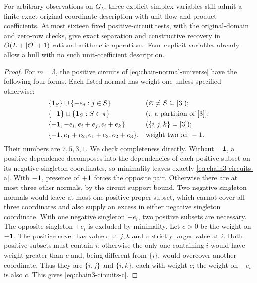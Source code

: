 \begin{theorem}\label{thm:three-state-chain}
For arbitrary observations on $G_L$, three explicit simplex variables
still admit a finite exact original-coordinate description with unit
flow and product coefficients. At most sixteen fixed positive-circuit tests,
with the original-domain and zero-row checks, give exact separation
and constructive recovery in $O(L+|\mathcal O|+1)$ rational arithmetic
operations. Four explicit variables already allow a hull with no
such unit-coefficient description.
\end{theorem}
\begin{proof}
For $m=3$, the positive circuits of \eqref{eq:chain-normal-universe}
have the following four forms. Each listed normal has weight one
unless specified otherwise:
\begin{align}
 &\{\mathbf 1_S\}\cup\{-e_j:j\in S\}
       &&(\varnothing\ne S\subseteq[3]);\label{eq:chain3-circuits-a}\\
 &\{-\mathbf 1\}\cup\{\mathbf 1_S:S\in\pi\}
       &&(\pi\text{ a partition of }[3]);\label{eq:chain3-circuits-b}\\
 &\{-\mathbf 1,-e_i,e_i+e_j,e_i+e_k\}
       &&(\{i,j,k\}=[3]);\label{eq:chain3-circuits-c}\\
 &\{-\mathbf 1,e_1+e_2,e_1+e_3,e_2+e_3\},
       &&\text{weight two on }-\mathbf 1.\label{eq:chain3-circuits-d}
\end{align}
Their numbers are $7,5,3,1$. We check completeness directly.
Without $-\mathbf 1$, a positive dependence decomposes into the
dependencies of each positive subset on its negative singleton
coordinates, so minimality leaves exactly
\eqref{eq:chain3-circuits-a}. With $-\mathbf 1$, presence of $+\mathbf 1$
forces the opposite pair. Otherwise there are at most three other
normals, by the circuit support bound. Two negative singleton
normals would leave at most one positive proper subset, which
cannot cover all three coordinates and also supply an excess in
either negative singleton coordinate. With one negative singleton
$-e_i$, two positive subsets are necessary. The opposite singleton
$+e_i$ is excluded by minimality. Let $c>0$ be the weight on
$-\mathbf 1$. The positive cover has value $c$ at $j,k$ and a strictly
larger value at $i$. Both positive subsets must contain $i$: otherwise
the only one containing $i$ would have weight greater than $c$ and,
being different from $\{i\}$, would overcover another coordinate.
Thus they are $\{i,j\}$ and $\{i,k\}$, each with weight $c$;
the weight on $-e_i$ is also $c$. This gives
\eqref{eq:chain3-circuits-c}.


\end{proof}
